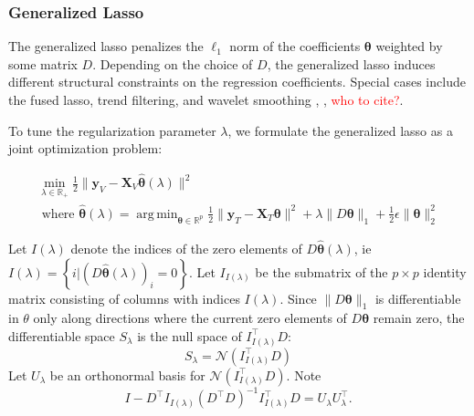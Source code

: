 \documentclass[10pt,letterpaper]{article}
\DeclareMathOperator*{\argmin}{arg\,min}
\begin{document}
\subsubsection{Generalized Lasso}
The generalized lasso \citep{roth2004generalized} penalizes the $\ell_1$ norm of the coefficients $\boldsymbol \theta$ weighted by some matrix $D$. Depending on the choice of $D$, the generalized lasso induces different structural constraints on the regression coefficients. Special cases include the fused lasso, trend filtering, and wavelet smoothing \citep{tibshirani2005sparsity}, \citep{kim2009ell_1}, \textcolor{red}{who to cite?}.

To tune the regularization parameter $\lambda$, we formulate the generalized lasso as a joint optimization problem:

\begin{equation}
\begin{array}{c}
\min_{\lambda \in \mathbb{R}_{+}} \frac{1}{2} \| \boldsymbol{y}_V - \boldsymbol{X}_V \hat{\boldsymbol{\theta}} (\lambda) \| ^2 \\
\text{ where }
\hat{\boldsymbol{\theta}} (\lambda) =
\argmin_{\boldsymbol{\theta} \in \mathbb{R}^p}
\frac{1}{2} \| \boldsymbol{y}_T - \boldsymbol{X}_T \boldsymbol{\theta} \| ^2
+ \lambda \| D \boldsymbol{\theta} \|_1
+ \frac{1}{2} \epsilon \| \boldsymbol{\theta} \|_2^2
\end{array}
\label{genlasso}
\end{equation}

Let $I(\lambda)$ denote the indices of the zero elements of $D \hat{\boldsymbol{\theta}}(\lambda)$, ie $I(\lambda) = \left \{i | (D \hat{\boldsymbol{\theta}}(\lambda))_i = 0 \right \}$.
Let $I_{I(\lambda)}$ be the submatrix of the $p \times p$ identity matrix consisting of columns with indices $I(\lambda)$. Since $\|D \boldsymbol{\theta}\|_1$ is differentiable in $\theta$ only along directions where the current zero elements of $D \boldsymbol{\theta}$ remain zero, the differentiable space $S_\lambda$ is the null space of $I_{I(\lambda)}^\top D$:
\begin{equation}
S_\lambda = \mathcal{N}(I_{I(\lambda)}^\top D)
\end{equation}
Let $U_\lambda$ be an orthonormal basis for $\mathcal{N}(I_{I(\lambda)}^\top D)$. Note
\begin{equation}
I - D^\top I_{I(\lambda)} \left ( D^\top D\right )^{-1} I_{I(\lambda)}^\top D = U_\lambda U_\lambda^\top.
\end{equation}
\end{document}
